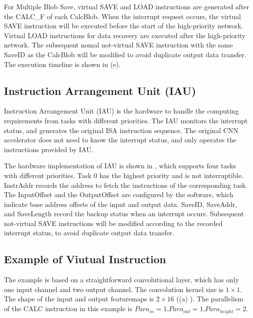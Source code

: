 For Multiple Blob Save, virtual SAVE and LOAD instructions are generated after the CALC\_F of each CalcBlob. When the interrupt request occurs, the virtual SAVE instruction will be executed before the start of the high-priority network. Virtual LOAD instructions for data recovery are executed after the high-priority network. The subsequent nomal not-virtual SAVE instruction with the same SaveID as the CalcBlob will be modified to avoid duplicate output data transfer. The execution timeline is shown in (e).



\subsection{ Instruction Arrangement Unit (IAU) }

Instruction Arrangement Unit (IAU) is the hardware to handle the computing requirements from tasks with different priorities. The IAU monitors the interrupt status, and generates the original ISA instruction sequence. The original CNN accelerator does not need to know the interrupt status, and only operates the instructions provided by IAU.

The hardware implementation of IAU is shown in , which supports four tasks with different priorities. Task 0 has the highest priority and is not interruptible. 
InstrAddr records the address to fetch the instructions of the corresponding task. The InputOffset and the OutputOffset are configured by the software, which indicate base address offsets of the input and output data. 
SaveID, SaveAddr, and SaveLength record the backup status when an interrupt occurs. 
Subsequent not-virtual SAVE instructions will be modified according to the recorded interrupt status, to avoid duplicate output data transfer.


\subsection{Example of Viutual Instruction}
\label{sec:exampleVirtual}


The example is based on a straightforward convolutional layer, which has only one input channel and two output channel. 
The convolution kernel size is $1 \times 1$. The shape of the input and output featuremaps is $ 2 \times 16 $ ((a) ). The parallelism of the CALC instruction in this example is $ Para_{in} = 1$,$ Para_{out}=1$,$Para_{height}=2$.

